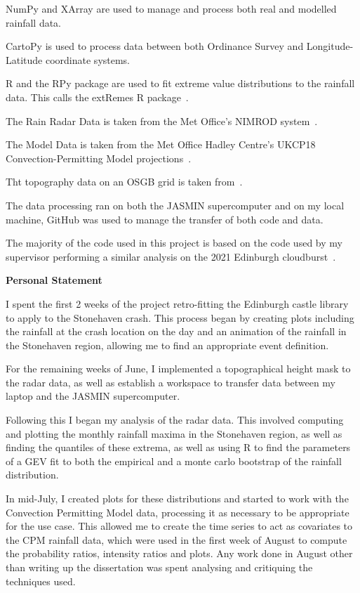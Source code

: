 \documentclass[12pt,a4paper,oneside]{report}
\begin{document}
NumPy and XArray are used to manage and process both real and modelled rainfall data.

CartoPy is used to process data between both Ordinance Survey and Longitude-Latitude coordinate systems.

R and the RPy package are used to fit extreme value distributions to the rainfall data.
This calls the extRemes R package~\cite{extremes_R}.

The Rain Radar Data is taken from the Met Office's NIMROD system~\cite{radar_data}.

The Model Data is taken from the Met Office Hadley Centre's UKCP18 Convection-Permitting Model projections~\cite{model_data}.

Tht topography data on an OSGB grid is taken from~\cite{radar_topog}.

The data processing ran on both the JASMIN supercomputer and on my local machine,
GitHub was used to manage the transfer of both code and data.

The majority of the code used in this project is based on the code used by my supervisor performing a similar analysis on the 2021 Edinburgh cloudburst~\cite{Tett_Soon}.


\newpage

\begin{center}
\textbf{Personal Statement} %
\end{center}

I spent the first 2 weeks of the project retro-fitting the Edinburgh castle
library to apply to the Stonehaven crash.
This process began by creating plots including the
rainfall at the crash location on the day and an animation of the rainfall
in the Stonehaven region, allowing me to find an appropriate event definition.

For the remaining weeks of June, I implemented a topographical height mask
to the radar data, as well as establish a workspace to transfer data between
my laptop and the JASMIN supercomputer.

Following this I began my analysis of the radar data.
This involved computing and plotting the monthly rainfall maxima in
the Stonehaven region, as well as finding the quantiles of these extrema,
as well as using R to find the parameters of a GEV fit to both the empirical
and a monte carlo bootstrap of the rainfall distribution.

In mid-July, I created plots for these distributions and started to work with the Convection Permitting Model data,
    processing it as necessary to be appropriate for the use case.
This allowed me to create the time series to act as covariates to the CPM rainfall data,
    which were used in the first week of August to compute the probability ratios, intensity ratios and plots.
Any work done in August other than writing up the dissertation was spent analysing and critiquing the techniques used.
\end{document}
